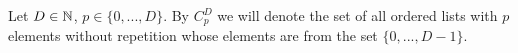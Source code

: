 \begin{notation}
  Let
    $D \in \mathbb{N}$,
    $p \in \{0, ..., D\}$.
  By $C^D_p$ we will denote the set of all ordered lists with $p$ elements
  without repetition whose elements are from the set $\{0, ..., D - 1\}$.
\end{notation}
